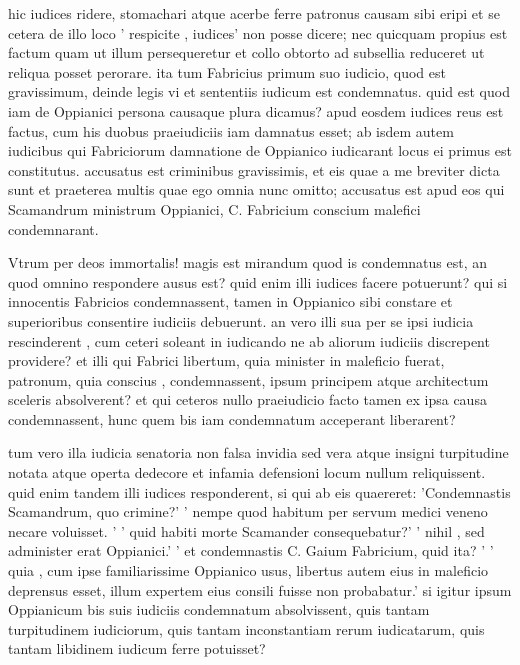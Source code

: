  hic iudices ridere, stomachari atque acerbe ferre patronus causam sibi eripi et se cetera de illo loco ' respicite , iudices' non posse dicere; nec quicquam propius est factum quam ut illum persequeretur et collo obtorto ad subsellia reduceret ut reliqua posset perorare. ita tum Fabricius primum suo iudicio, quod est gravissimum, deinde legis vi et sententiis iudicum est condemnatus. quid est quod iam de Oppianici persona causaque plura dicamus? apud eosdem iudices reus est factus, cum his duobus praeiudiciis iam damnatus esset; ab isdem autem iudicibus qui Fabriciorum damnatione de Oppianico iudicarant locus ei primus est constitutus. accusatus est criminibus gravissimis, et eis quae a me breviter dicta sunt et praeterea multis quae ego omnia nunc omitto; accusatus est apud eos qui Scamandrum ministrum Oppianici, C. Fabricium conscium malefici condemnarant.

 Vtrum per deos immortalis! magis est mirandum quod is condemnatus est, an quod omnino respondere ausus est? quid enim illi iudices facere potuerunt? qui si innocentis Fabricios condemnassent, tamen in Oppianico sibi constare et superioribus consentire iudiciis debuerunt. an vero illi sua per se ipsi iudicia rescinderent , cum ceteri soleant in iudicando ne ab aliorum iudiciis discrepent providere? et illi qui Fabrici libertum, quia minister in maleficio fuerat, patronum, quia conscius , condemnassent, ipsum principem atque architectum sceleris absolverent? et qui ceteros nullo praeiudicio facto tamen ex ipsa causa condemnassent, hunc quem bis iam condemnatum acceperant liberarent?

 tum vero illa iudicia senatoria non falsa invidia sed vera atque insigni turpitudine notata atque operta dedecore et infamia defensioni locum nullum reliquissent. quid enim tandem illi iudices responderent, si qui ab eis quaereret: 'Condemnastis Scamandrum, quo crimine?' ' nempe quod habitum per servum medici veneno necare voluisset. ' ' quid habiti morte Scamander consequebatur?' ' nihil , sed administer erat Oppianici.' ' et condemnastis C. Gaium Fabricium, quid ita? ' ' quia , cum ipse familiarissime Oppianico usus, libertus autem eius in maleficio deprensus esset, illum expertem eius consili fuisse non probabatur.' si igitur ipsum Oppianicum bis suis iudiciis condemnatum absolvissent, quis tantam turpitudinem iudiciorum, quis tantam inconstantiam rerum iudicatarum, quis tantam libidinem iudicum ferre potuisset?

